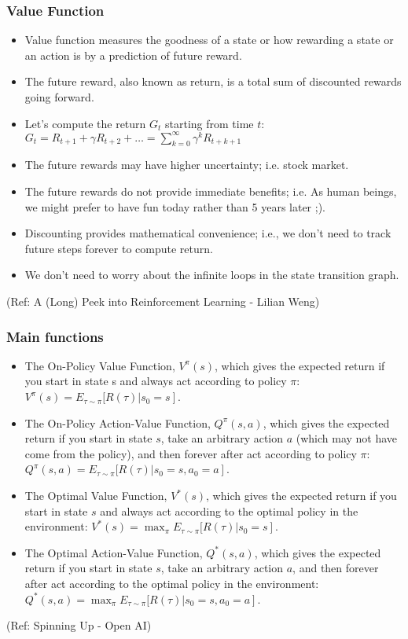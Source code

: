 \begin{frame}[fragile]\frametitle{Value Function}


\begin{itemize}
\item Value function measures the goodness of a state or how rewarding a state or an action is by a
prediction of future reward. 
\item The future reward, also known as return, is a total sum of discounted rewards going forward. 
\item Let’s compute the return $G_t$ starting from time $t$: $G_t = R_{t+1} + \gamma R_{t+2} + \ldots = \sum_{k=0}^{\infty} \gamma^kR_{t+k+1}$
\item The future rewards may have higher uncertainty; i.e. stock market.
\item The future rewards do not provide immediate benefits; i.e. As human beings, we might prefer to
have fun today rather than 5 years later ;).
\item Discounting provides mathematical convenience; i.e., we don’t need to track future steps forever to
compute return.
\item We don’t need to worry about the infinite loops in the state transition graph.
\end{itemize}

{\tiny (Ref: A (Long) Peek into Reinforcement Learning - Lilian Weng)}
\end{frame}

\begin{frame}[fragile]\frametitle{Main functions}

\begin{itemize}
\item The On-Policy Value Function, $V^{\pi}(s)$, which gives the expected return if you start in state s and always act according to policy $\pi$:$V^{\pi}(s) = E_{\tau \sim \pi}[R(\tau)\left| s_0 = s\right]$.
\item The On-Policy Action-Value Function, $Q^{\pi}(s,a)$, which gives the expected return if you start in state $s$, take an arbitrary action $a$ (which may not have come from the policy), and then forever after act according to policy $\pi$: $Q^{\pi}(s,a) = E_{\tau \sim \pi}[R(\tau)\left| s_0 = s, a_0 = a\right]$.
\item The Optimal Value Function, $V^*(s)$, which gives the expected return if you start in state $s$ and always act according to the optimal policy in the environment:
$V^*(s) = \max_{\pi} E_{\tau \sim \pi}[R(\tau)\left| s_0 = s\right]$.
\item The Optimal Action-Value Function, $Q^*(s,a)$, which gives the expected return if you start in state $s$, take an arbitrary action $a$, and then forever after act according to the optimal policy in the environment: $Q^*(s,a) = \max_{\pi} E_{\tau \sim \pi}[R(\tau)\left| s_0 = s, a_0 = a\right]$.
\end{itemize}

{\tiny (Ref: Spinning Up - Open AI)}
\end{frame}



